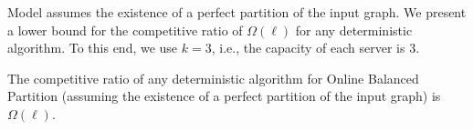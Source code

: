 
Model assumes the existence of a perfect partition of the input graph.
We present a lower bound for the competitive ratio of $\Omega(\ell)$ for any deterministic algorithm.
To this end, we use $k = 3$, i.e., the capacity of each server is $3$.


\begin{theorem}
  The competitive ratio of any deterministic algorithm for Online Balanced Partition (assuming the existence of a perfect partition of the input graph) is $\Omega(\ell)$.
  \label{th:lb_omega_l}
\end{theorem}

